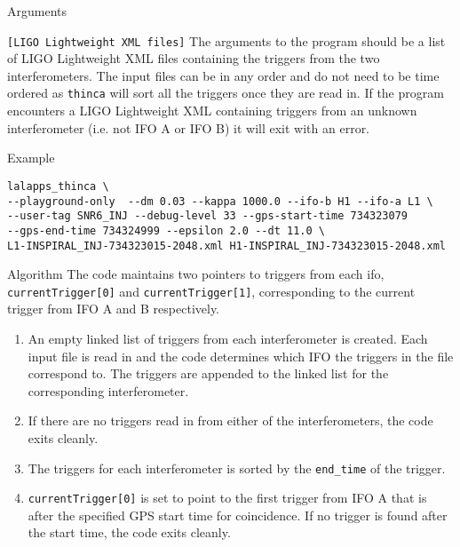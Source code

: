 \begin{entry}
\begin{entry}
\end{entry}

\item[Arguments]\leavevmode
\begin{entry}
\item[\texttt{[LIGO Lightweight XML files]}] The arguments to the program
should be a list of LIGO Lightweight XML files containing the triggers from
the two interferometers. The input files can be in any order and do not need
to be time ordered as \texttt{thinca} will sort all the triggers once they are
read in. If the program encounters a LIGO Lightweight XML containing triggers
from an unknown interferometer (i.e. not IFO A or IFO B) it will exit with an
error.
\end{entry}

\item[Example]
\begin{verbatim}
lalapps_thinca \
--playground-only  --dm 0.03 --kappa 1000.0 --ifo-b H1 --ifo-a L1 \
--user-tag SNR6_INJ --debug-level 33 --gps-start-time 734323079
--gps-end-time 734324999 --epsilon 2.0 --dt 11.0 \
L1-INSPIRAL_INJ-734323015-2048.xml H1-INSPIRAL_INJ-734323015-2048.xml
\end{verbatim}

\item[Algorithm]
The code maintains two pointers to triggers from each ifo,
\texttt{currentTrigger[0]} and \texttt{currentTrigger[1]}, corresponding to
the current trigger from IFO A and B respectively.

\begin{enumerate}
\item An empty linked list of triggers from each interferometer is created.
Each input file is read in and the code determines which IFO the triggers in
the file correspond to. The triggers are appended to the linked list for the
corresponding interferometer.

\item If there are no triggers read in from either of the interferometers,
the code exits cleanly.

\item The triggers for each interferometer is sorted by the \texttt{end\_time}
of the trigger.

\item \texttt{currentTrigger[0]} is set to point to the first trigger from IFO
A that is after the specified GPS start time for coincidence. If no trigger is
found after the start time, the code exits cleanly.


\end{enumerate}
\end{entry}
